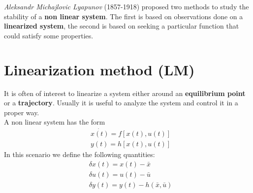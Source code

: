 \textit{Aleksandr Michajlovic Lyapunov} (1857-1918) proposed two methods to study the stability of a \textbf{non linear system}. The first is based on observations done on a \textbf{linearized system}, the second is based on seeking a particular function that could satisfy some properties.

\section{Linearization method (LM)}
It is often of interest to linearize a system either around an \textbf{equilibrium point} or a \textbf{trajectory}. Usually it is useful to analyze the system and control it in a proper way.\\
A non linear system has the form 
\begin{align*}
    &\dot{x(t)}=f[x(t), u(t)]\\
    &y(t)=h[x(t), u(t)]
\end{align*}
In this scenario we define the following quantities:
\begin{align*}
    &\delta x(t) = x(t)-\bar{x}\\
    &\delta u(t) = u(t)-\bar{u}\\
    &\delta y(t)=y(t)-h(\bar{x}, \bar{u})
\end{align*}

